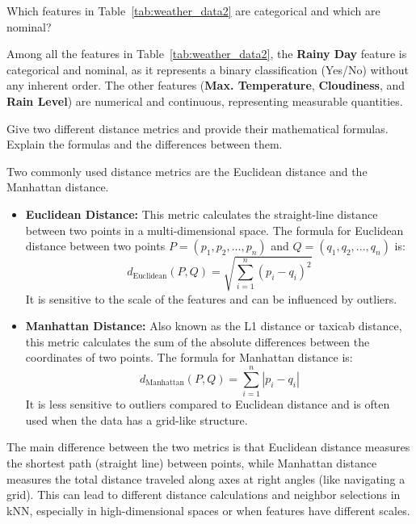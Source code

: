 \documentclass[12pt]{article}
\begin{document}
    \begin{ejercicio}
        Which features in Table~\ref{tab:weather_data2} are categorical and which are nominal?

        Among all the features in Table~\ref{tab:weather_data2}, the \textbf{Rainy Day} feature is categorical and nominal, as it represents a binary classification (Yes/No) without any inherent order. The other features (\textbf{Max. Temperature}, \textbf{Cloudiness}, and \textbf{Rain Level}) are numerical and continuous, representing measurable quantities.
    \end{ejercicio}

    \begin{ejercicio}
        Give two different distance metrics and provide their mathematical formulas. Explain the formulas and the differences between them.

        Two commonly used distance metrics are the Euclidean distance and the Manhattan distance.
        \begin{itemize}
            \item \textbf{Euclidean Distance:} This metric calculates the straight-line distance between two points in a multi-dimensional space. The formula for Euclidean distance between two points $P = (p_1, p_2, ..., p_n)$ and $Q = (q_1, q_2, ..., q_n)$ is:
            \[
            d_{\text{Euclidean}}(P, Q) = \sqrt{\sum_{i=1}^{n} (p_i - q_i)^2}
            \]
            It is sensitive to the scale of the features and can be influenced by outliers.

            \item \textbf{Manhattan Distance:} Also known as the L1 distance or taxicab distance, this metric calculates the sum of the absolute differences between the coordinates of two points. The formula for Manhattan distance is:
            \[
            d_{\text{Manhattan}}(P, Q) = \sum_{i=1}^{n} |p_i - q_i|
            \]
            It is less sensitive to outliers compared to Euclidean distance and is often used when the data has a grid-like structure.
        \end{itemize}
        The main difference between the two metrics is that Euclidean distance measures the shortest path (straight line) between points, while Manhattan distance measures the total distance traveled along axes at right angles (like navigating a grid). This can lead to different distance calculations and neighbor selections in kNN, especially in high-dimensional spaces or when features have different scales.
    \end{ejercicio}
\end{document}
